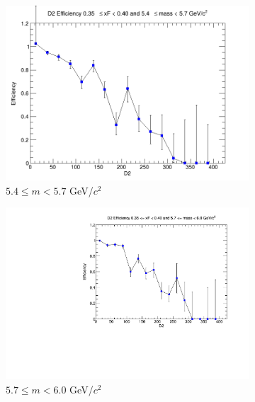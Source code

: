 \begin{figure}[p]
\begin{subfigure}[b]{0.32\textwidth}
        \includegraphics[width=\textwidth]{./kTrackerEfficiencyPlots/D2_Efficiency_xF7_mass4.png}
        \caption{$5.4 \leq m < 5.7$ GeV/$c^2$}
        \label{fig:xF7_mass4}
    \end{subfigure}
    \hfill
    \begin{subfigure}[b]{0.32\textwidth}
        \centering
        \includegraphics[width=\textwidth]{./kTrackerEfficiencyPlots/D2_Efficiency_xF7_mass5.pdf}
        \caption{$5.7 \leq m < 6.0$ GeV/$c^2$}
        \label{fig:xF7_mass5}
    \end{subfigure}
    \vspace{0.5cm}
    \begin{subfigure}[b]{0.32\textwidth}
        \centering

\end{subfigure}
\end{figure}
